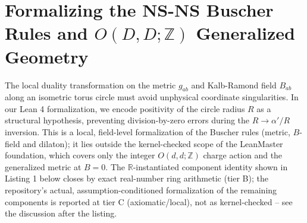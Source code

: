 \documentclass[11pt,a4paper]{article}
\begin{document}
\section{Formalizing the NS-NS Buscher Rules and \texorpdfstring{$O(D,D;\mathbb{Z})$}{O(D,D;Z)} Generalized Geometry}
The local duality transformation on the metric $g_{ab}$ and Kalb-Ramond field $B_{ab}$ along an isometric torus circle must avoid unphysical coordinate singularities. In our Lean 4 formalization, we encode positivity of the circle radius $R$ as a structural hypothesis, preventing division-by-zero errors during the $R \to \alpha'/R$ inversion. This is a local, field-level formalization of the Buscher rules (metric, $B$-field and dilaton); it lies outside the kernel-checked scope of the LeanMaster foundation, which covers only the integer $O(d,d;\mathbb{Z})$ charge action and the generalized metric at $B=0$. The $\mathbb{R}$-instantiated component identity shown in Listing 1 below closes by exact real-number ring arithmetic (tier B); the repository's actual, assumption-conditioned formalization of the remaining components is reported at tier C (axiomatic/local), not as kernel-checked -- see the discussion after the listing.
\end{document}
